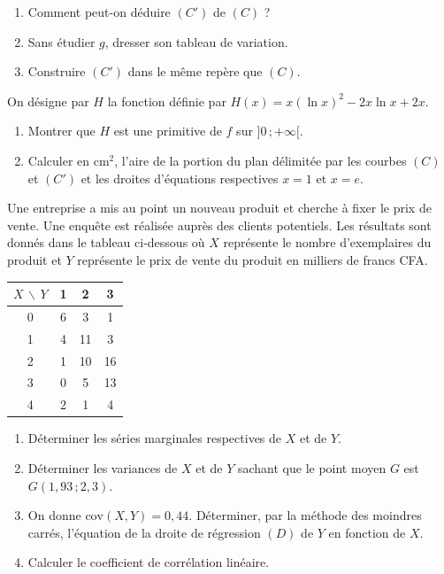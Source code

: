 \documentclass[11pt]{article}
\begin{document}
\begin{enumerate}
  \item Comment peut-on déduire $(C')$ de $(C)$ ?
  \item Sans étudier $g$, dresser son tableau de variation.
  \item Construire $(C')$ dans le même repère que $(C)$.
\end{enumerate}

On désigne par $H$ la fonction définie par $H(x) = x(\ln x)^2 - 2x\ln x + 2x$.

\begin{enumerate}
  \item Montrer que $H$ est une primitive de $f$ sur $]0\,;+\infty[$.
  \item Calculer en cm$^2$, l'aire de la portion du plan délimitée par les courbes $(C)$ et $(C')$ et les droites d'équations respectives $x = 1$ et $x = e$.
\end{enumerate}


Une entreprise a mis au point un nouveau produit et cherche à fixer le prix de vente. Une enquête est réalisée auprès des clients potentiels. Les résultats sont donnés dans le tableau ci-dessous où $X$ représente le nombre d'exemplaires du produit et $Y$ représente le prix de vente du produit en milliers de francs CFA.

\begin{center}
\renewcommand{\arraystretch}{1.3}
\begin{tabular}{|c|c|c|c|}
\hline
$X\,\backslash\,Y$ & 1 & 2 & 3 \\
\hline
0 & 6 & 3 & 1 \\
\hline
1 & 4 & 11 & 3 \\
\hline
2 & 1 & 10 & 16 \\
\hline
3 & 0 & 5 & 13 \\
\hline
4 & 2 & 1 & 4 \\
\hline
\end{tabular}
\end{center}

\begin{enumerate}
  \item Déterminer les séries marginales respectives de $X$ et de $Y$.
  \item Déterminer les variances de $X$ et de $Y$ sachant que le point moyen $G$ est $G(1{,}93\,;2{,}3)$.
  \item On donne $\mathrm{cov}(X, Y) = 0{,}44$. Déterminer, par la méthode des moindres carrés, l'équation de la droite de régression $(D)$ de $Y$ en fonction de $X$.
  \item Calculer le coefficient de corrélation linéaire.
\end{enumerate}
\end{document}
